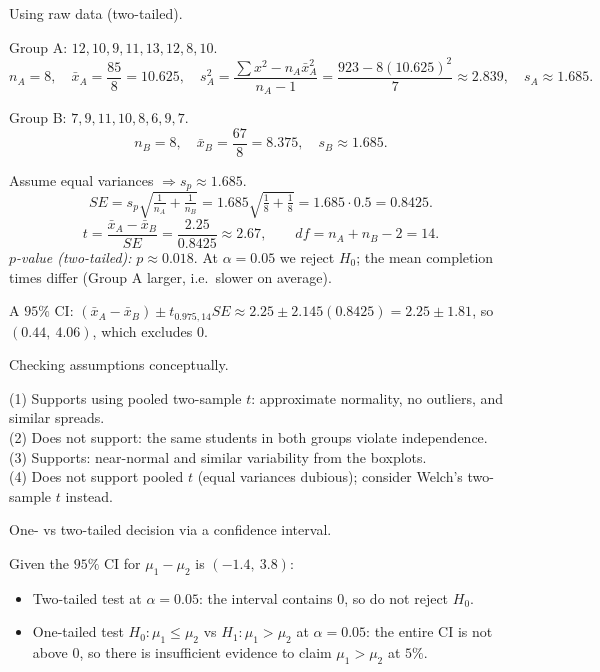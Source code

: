 \documentclass[11pt]{article}
\def\textbf#1{#1}%
\def\textit#1{#1}%
\def\mathrm#1{#1}%
\begin{document}
\begin{solution}
\textbf{Using raw data (two-tailed).}

Group A: $12,10,9,11,13,12,8,10$.
\[
n_A=8,\quad \bar x_A=\frac{85}{8}=10.625,\quad s_A^2=\frac{\sum x^2-n_A\bar x_A^2}{n_A-1}
=\frac{923-8(10.625)^2}{7}\approx 2.839,\quad s_A\approx 1.685.
\]

Group B: $7,9,11,10,8,6,9,7$.
\[
n_B=8,\quad \bar x_B=\frac{67}{8}=8.375,\quad s_B\approx 1.685.
\]

Assume equal variances $\Rightarrow s_p\approx 1.685$.
\[
\mathrm{SE}=s_p\sqrt{\tfrac1{n_A}+\tfrac1{n_B}}=1.685\sqrt{\tfrac18+\tfrac18}
=1.685\cdot 0.5=0.8425.
\]
\[
t=\frac{\bar x_A-\bar x_B}{\mathrm{SE}}=\frac{2.25}{0.8425}\approx 2.67,\qquad
\mathrm{df}=n_A+n_B-2=14.
\]
\emph{$p$-value (two-tailed):} $p\approx 0.018$.
At $\alpha=0.05$ we \textbf{reject} $H_0$; the mean completion times differ (Group A larger, i.e.\ slower on average).

A $95\%$ CI: $(\bar x_A-\bar x_B)\pm t_{0.975,14}\mathrm{SE}\approx 2.25\pm 2.145(0.8425)=2.25\pm 1.81$,
so $\boxed{(0.44,\ 4.06)}$, which excludes $0$.
\end{solution}

\begin{solution}
\textbf{Checking assumptions conceptually.}

(1) \textit{Supports} using pooled two-sample $t$: approximate normality, no outliers, and similar spreads.\\
(2) \textit{Does not support}: the same students in both groups violate independence.\\
(3) \textit{Supports}: near-normal and similar variability from the boxplots.\\
(4) \textit{Does not support} pooled $t$ (equal variances dubious); consider Welch’s two-sample $t$ instead.
\end{solution}

\begin{solution}
\textbf{One- vs two-tailed decision via a confidence interval.}

Given the $95\%$ CI for $\mu_1-\mu_2$ is $(-1.4,\ 3.8)$:
\begin{itemize}
  \item Two-tailed test at $\alpha=0.05$: the interval contains $0$, so \textbf{do not reject} $H_0$.
  \item One-tailed test $H_0:\mu_1\le\mu_2$ vs $H_1:\mu_1>\mu_2$ at $\alpha=0.05$: the entire CI is not above $0$,
        so there is \textbf{insufficient evidence} to claim $\mu_1>\mu_2$ at $5\%$.
\end{itemize}
\end{solution}
\end{document}
